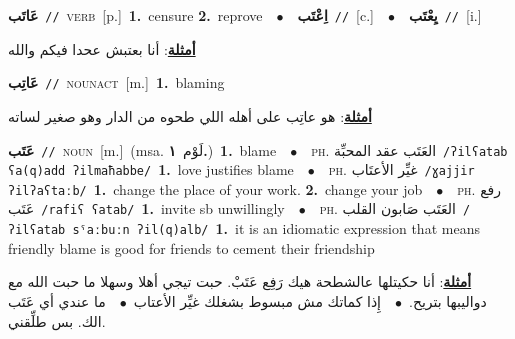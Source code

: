 \documentclass[10pt,a4paper,twoside]{article} %
\begin{document}
\begin{multicols}{2}
{\setlength\topsep{0pt}\textbf{\foreignlanguage{arabic}{عَاتَب}}\ {\color{gray}\texttt{//}\color{black}}\ \textsc{verb}\ [p.]\ \textbf{1.}~censure  \textbf{2.}~reprove\ \ $\bullet$\ \ \setlength\topsep{0pt}\textbf{\foreignlanguage{arabic}{اِعْتَب}}\ {\color{gray}\texttt{//}\color{black}}\ [c.]\ \ $\bullet$\ \ \setlength\topsep{0pt}\textbf{\foreignlanguage{arabic}{يِعْتَب}}\ {\color{gray}\texttt{//}\color{black}}\ [i.]\  \begin{flushright}\color{gray}\foreignlanguage{arabic}{\textbf{\underline{\foreignlanguage{arabic}{أمثلة}}}: أنا بعتبش عحدا فيكم والله}\end{flushright}\color{black}} \vspace{2mm}

{\setlength\topsep{0pt}\textbf{\foreignlanguage{arabic}{عَاتِب}}\ {\color{gray}\texttt{//}\color{black}}\ \textsc{noun\textunderscore act}\ [m.]\ \textbf{1.}~blaming\  \begin{flushright}\color{gray}\foreignlanguage{arabic}{\textbf{\underline{\foreignlanguage{arabic}{أمثلة}}}: هو عاتِب على أهله اللي طحوه من الدار وهو صغير لساته}\end{flushright}\color{black}} \vspace{2mm}

{\setlength\topsep{0pt}\textbf{\foreignlanguage{arabic}{عَتَب}}\ {\color{gray}\texttt{//}\color{black}}\ \textsc{noun}\ [m.]\ \color{gray}(msa. \foreignlanguage{arabic}{لَوْم}~\foreignlanguage{arabic}{\textbf{١.}})\color{black}\ \textbf{1.}~blame\ \ $\bullet$\ \ \textsc{ph.} \color{gray} \foreignlanguage{arabic}{العَتَب عقد المحبِّة}\color{black}\ {\color{gray}\texttt{/{\sffamily ʔilʕatab ʕa(q)add ʔilmaħabbe}/}\color{black}}\ \textbf{1.}~love justifies blame\ \ $\bullet$\ \ \textsc{ph.} \color{gray} \foreignlanguage{arabic}{غيِّر الأعتَاب}\color{black}\ {\color{gray}\texttt{/{\sffamily ɣajjir ʔilʔaʕtaːb}/}\color{black}}\ \textbf{1.}~change the place of your work.  \textbf{2.}~change your job\ \ $\bullet$\ \ \textsc{ph.} \color{gray} \foreignlanguage{arabic}{رفع عَتَب}\color{black}\ {\color{gray}\texttt{/{\sffamily rafiʕ ʕatab}/}\color{black}}\ \textbf{1.}~invite sb unwillingly\ \ $\bullet$\ \ \textsc{ph.} \color{gray} \foreignlanguage{arabic}{العَتَب صَابون القلب}\color{black}\ {\color{gray}\texttt{/{\sffamily ʔilʕatab sˤaːbuːn ʔil(q)alb}/}\color{black}}\ \textbf{1.}~it is an idiomatic expression that means friendly blame is good for friends to cement their friendship\  \begin{flushright}\color{gray}\foreignlanguage{arabic}{\textbf{\underline{\foreignlanguage{arabic}{أمثلة}}}: أنا حكيتلها عالشطحة هيك رَفِع عَتَبْ. حبت تيجي أهلا وسهلا ما حبت الله مع دواليبها بتريح.\ $\bullet$\ \  إِذا كماتك مش مبسوط بشغلك غيِّر الأعتاب\ $\bullet$\ \  ما عندي أي عَتَب الك. بس طلِّقني.}\end{flushright}\color{black}} \vspace{2mm}


\end{multicols}
\end{document}
